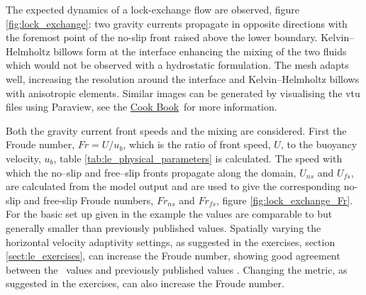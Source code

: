 The expected dynamics of a lock-exchange flow are observed, figure \ref{fig:lock_exchange}: two gravity currents propagate in opposite directions with the foremost point of the no-slip front raised above the lower boundary. Kelvin--Helmholtz billows form at the interface enhancing the mixing of the two fluids which would not be observed with a hydrostatic formulation. The mesh adapts well, increasing the resolution around the interface and Kelvin--Helmholtz billows with anisotropic elements. Similar images can be generated by visualising the vtu files using Paraview, see the \href{http://amcg.ese.ic.ac.uk/index.php?title=Cook_Book}{Cook Book}\ for more information.

Both the gravity current front speeds and the mixing are considered. First the Froude number, $Fr = U/u_b$, which is the ratio of front speed, $U$, to the buoyancy velocity, $u_b$, table \ref{tab:le_physical_parameters} is calculated. The speed with which the no--slip and free--slip fronts propagate along the domain, $U_{ns}$ and $U_{fs}$, are calculated from the model output and are used to give the corresponding no-slip and free-slip Froude numbers, $Fr_{ns}$ and $Fr_{fs}$, figure \ref{fig:lock_exchange_Fr}. For the basic set up given in the example the values are comparable to but generally smaller than previously published values. Spatially varying the horizontal velocity adaptivity settings, as suggested in the exercises, section \ref{sect:le_exercises}, can increase the Froude number, showing good agreement between the \fluidity\ values and previously published values \citep{hiester2011}. Changing the metric, as suggested in the exercises, can also increase the Froude number.

